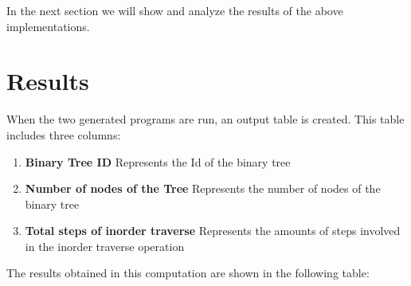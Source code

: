 \documentclass[12p]{article}
\begin{document}
In the next section we will show and analyze the results of the above implementations.


  \section{Results}
When the two generated programs are run, an output table is created. This table includes three columns:
\begin{enumerate}
  \item \textbf{Binary Tree ID } Represents the Id of the binary tree
  \item \textbf{Number of nodes of the Tree } Represents the number of nodes of the binary tree 
  \item \textbf{Total steps of inorder traverse } Represents the amounts of steps involved in the inorder traverse operation
\end{enumerate}

The results obtained in this computation are shown in the following table:

\end{document}
